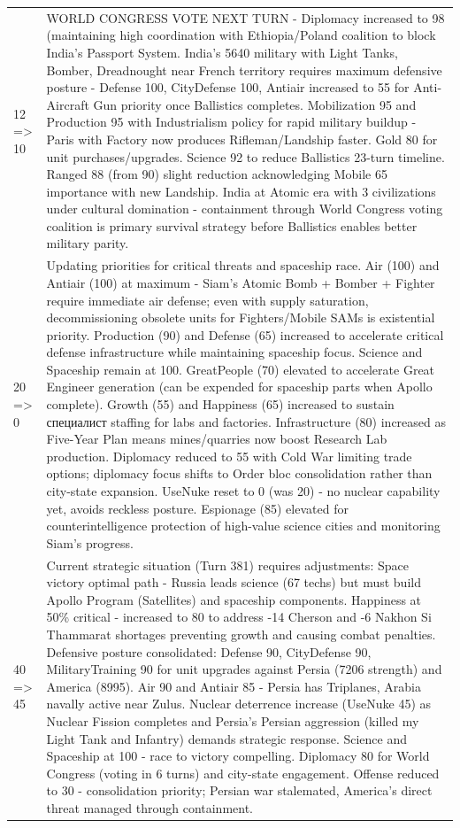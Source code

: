 \begin{longtable}{p{}p{}}
12 => 10 & WORLD CONGRESS VOTE NEXT TURN - Diplomacy increased to 98 (maintaining high coordination with Ethiopia/Poland coalition to block India's Passport System. India's 5640 military with Light Tanks, Bomber, Dreadnought near French territory requires maximum defensive posture - Defense 100, CityDefense 100, Antiair increased to 55 for Anti-Aircraft Gun priority once Ballistics completes. Mobilization 95 and Production 95 with Industrialism policy for rapid military buildup - Paris with Factory now produces Rifleman/Landship faster. Gold 80 for unit purchases/upgrades. Science 92 to reduce Ballistics 23-turn timeline. Ranged 88 (from 90) slight reduction acknowledging Mobile 65 importance with new Landship. India at Atomic era with 3 civilizations under cultural domination - containment through World Congress voting coalition is primary survival strategy before Ballistics enables better military parity. \\
20 => 0 & Updating priorities for critical threats and spaceship race. Air (100) and Antiair (100) at maximum - Siam's Atomic Bomb + Bomber + Fighter require immediate air defense; even with supply saturation, decommissioning obsolete units for Fighters/Mobile SAMs is existential priority. Production (90) and Defense (65) increased to accelerate critical defense infrastructure while maintaining spaceship focus. Science and Spaceship remain at 100. GreatPeople (70) elevated to accelerate Great Engineer generation (can be expended for spaceship parts when Apollo complete). Growth (55) and Happiness (65) increased to sustain специалист staffing for labs and factories. Infrastructure (80) increased as Five-Year Plan means mines/quarries now boost Research Lab production. Diplomacy reduced to 55 with Cold War limiting trade options; diplomacy focus shifts to Order bloc consolidation rather than city-state expansion. UseNuke reset to 0 (was 20) - no nuclear capability yet, avoids reckless posture. Espionage (85) elevated for counterintelligence protection of high-value science cities and monitoring Siam's progress. \\
40 => 45 & Current strategic situation (Turn 381) requires adjustments: Space victory optimal path - Russia leads science (67 techs) but must build Apollo Program (Satellites) and spaceship components. Happiness at 50\% critical - increased to 80 to address -14 Cherson and -6 Nakhon Si Thammarat shortages preventing growth and causing combat penalties. Defensive posture consolidated: Defense 90, CityDefense 90, MilitaryTraining 90 for unit upgrades against Persia (7206 strength) and America (8995). Air 90 and Antiair 85 - Persia has Triplanes, Arabia navally active near Zulus. Nuclear deterrence increase (UseNuke 45) as Nuclear Fission completes and Persia's Persian aggression (killed my Light Tank and Infantry) demands strategic response. Science and Spaceship at 100 - race to victory compelling. Diplomacy 80 for World Congress (voting in 6 turns) and city-state engagement. Offense reduced to 30 - consolidation priority; Persian war stalemated, America's direct threat managed through containment. \\

\end{longtable}
